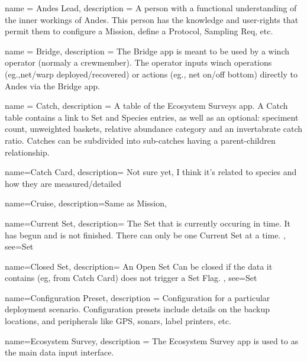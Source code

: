 \usepackage[nonumberlist]{glossaries}

\makenoidxglossaries

 {
  name = Andes Lead,
  description = {A person with a functional understanding of the inner workings of Andes.
   This person has the knowledge and user-rights that permit them to configure a \gls{Mission}, define a \gls{Protocol}, \gls{Sampling Req}, etc.}
}

 {
  name = Bridge,
  description = {
    The Bridge app is meant to be used by a winch operator (normaly a crewmember).
    The operator inputs winch operations (eg.,net/warp deployed/recovered) or actions (eg., net on/off bottom) directly to Andes via the Bridge app. 
  }
}

 {
  name = Catch,
  description = {
    A table of the Ecosystem Surveys app. A Catch table contains a link to \gls{Set} and \gls{Species} entries, as well as an optional: speciment count, unweighted baskets, relative abundance category and an invertabrate catch ratio. 
    Catches can be subdivided into sub-catches having a parent-children relationship.
  }
}

    
 {
  name=Catch Card,
  description= {
    Not sure yet, I think it's related to species and how they are measured/detailed
  }
}

 {
  name=Cruise,
  description={Same as \gls{Mission}},
}

 {
  name=Current Set,
  description= {
    The \gls{Set} that is currently occuring in time. 
    It has begun and is not finished. 
    There can only be one \gls{Current Set} at a time.
  },
  see={Set}
}

 {
  name=Closed Set,
  description= {
    An \gls{Open Set} Can be closed if the data it contains (eg, from \gls{Catch Card}) does not trigger a \gls{Set Flag}.
  },
  see={Set}
}

  {
  name=Configuration Preset,
  description = {
    Configuration for a particular deployment scenario. Configuration presets include details on the backup locations, and peripherals like GPS, sonars, label printers, etc.
  }
}

 {
  name=Ecosystem Survey,
  description = {
    The Ecosystem Survey app is used to as the main data input interface.
    }
}

